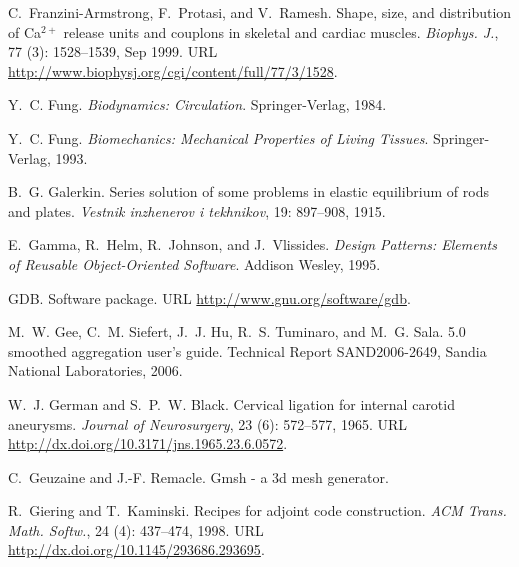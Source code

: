 \begin{thebibliography}{467}
C.~Franzini-Armstrong, F.~Protasi, and V.~Ramesh.
\newblock Shape, size, and distribution of {C}a$^{2+}$ release units and
  couplons in skeletal and cardiac muscles.
\newblock \emph{Biophys. J.}, 77 (3): 1528--1539, Sep 1999.
\newblock URL \url{http://www.biophysj.org/cgi/content/full/77/3/1528}.

Y.~C. Fung.
\newblock \emph{Biodynamics: Circulation}.
\newblock Springer-Verlag, 1984.

Y.~C. Fung.
\newblock \emph{Biomechanics: Mechanical Properties of Living Tissues}.
\newblock Springer-Verlag, 1993.

B.~G. Galerkin.
\newblock Series solution of some problems in elastic equilibrium of rods and
  plates.
\newblock \emph{Vestnik inzhenerov i tekhnikov}, 19: 897--908, 1915.

E.~Gamma, R.~Helm, R.~Johnson, and J.~Vlissides.
\newblock \emph{Design Patterns: Elements of Reusable Object-Oriented
  Software}.
\newblock Addison Wesley, 1995.

GDB.
\newblock Software package.
\newblock URL \url{http://www.gnu.org/software/gdb}.

M.~W. Gee, C.~M. Siefert, J.~J. Hu, R.~S. Tuminaro, and M.~G. Sala.
 5.0 smoothed aggregation user's guide.
\newblock Technical Report SAND2006-2649, Sandia National Laboratories, 2006.

W.~J. German and S.~P.~W. Black.
\newblock Cervical ligation for internal carotid aneurysms.
\newblock \emph{Journal of Neurosurgery}, 23 (6): 572--577,
  1965.
\newblock URL \url{http://dx.doi.org/10.3171/jns.1965.23.6.0572}.

C.~Geuzaine and J.-F. Remacle.
\newblock Gmsh - a 3d mesh generator.

R.~Giering and T.~Kaminski.
\newblock Recipes for adjoint code construction.
\newblock \emph{ACM Trans. Math. Softw.}, 24 (4): 437--474,
  1998.
\newblock URL \url{http://dx.doi.org/10.1145/293686.293695}.


\end{thebibliography}

